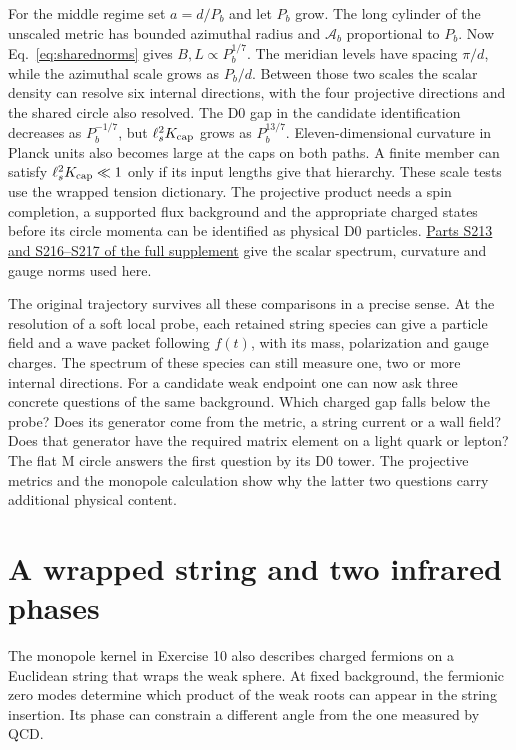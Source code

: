 \documentclass[10pt]{article}
\begin{document}
For the middle regime set $a=d/P_b$ and let $P_b$ grow. The long cylinder of the unscaled metric has bounded azimuthal radius and $\mathcal A_b$ proportional to $P_b$. Now Eq.~\eqref{eq:sharednorms} gives $B,L\propto P_b^{1/7}$. The meridian levels have spacing $\pi/d$, while the azimuthal scale grows as $P_b/d$. Between those two scales the scalar density can resolve six internal directions, with the four projective directions and the shared circle also resolved. The D0 gap in the candidate identification decreases as $P_b^{-1/7}$, but $\ell_s^2K_{\rm cap}$ grows as $P_b^{13/7}$. Eleven-dimensional curvature in Planck units also becomes large at the caps on both paths. A finite member can satisfy $\ell_s^2K_{\rm cap}\ll1$ only if its input lengths give that hierarchy. These scale tests use the wrapped tension dictionary. The projective product needs a spin completion, a supported flux background and the appropriate charged states before its circle momenta can be identified as physical D0 particles. \href{supplemental.pdf}{Parts S213 and S216--S217 of the full supplement} give the scalar spectrum, curvature and gauge norms used here.

The original trajectory survives all these comparisons in a precise sense. At the resolution of a soft local probe, each retained string species can give a particle field and a wave packet following $f(t)$, with its mass, polarization and gauge charges. The spectrum of these species can still measure one, two or more internal directions. For a candidate weak endpoint one can now ask three concrete questions of the same background. Which charged gap falls below the probe? Does its generator come from the metric, a string current or a wall field? Does that generator have the required matrix element on a light quark or lepton? The flat M circle answers the first question by its D0 tower. The projective metrics and the monopole calculation show why the latter two questions carry additional physical content.

\section{A wrapped string and two infrared phases}

The monopole kernel in Exercise 10 also describes charged fermions on a Euclidean string that wraps the weak sphere. At fixed background, the fermionic zero modes determine which product of the weak roots can appear in the string insertion. Its phase can constrain a different angle from the one measured by QCD.
\end{document}
